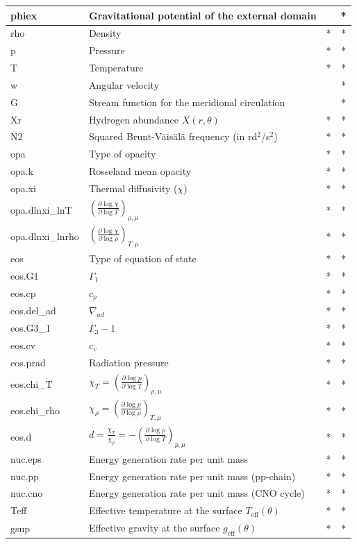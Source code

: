 \begin{longtable}{|l|p{8cm}|c|c|}
\hline
phiex&Gravitational potential of the external domain&&*\\
\hline
rho&Density&*&*\\
\hline
p&Pressure&*&*\\
\hline
T&Temperature&*&*\\
\hline
w&Angular velocity&&*\\
\hline
G&Stream function for the meridional circulation&&*\\
\hline
Xr&Hydrogen abundance $X(r,\theta)$&*&*\\
\hline
N2&Squared Brunt-V\"ais\"al\"a frequency (in rd$^2$/s$^2$)&*&*\\
\hline
opa&Type of opacity&*&*\\
\hline
opa.k&Rosseland mean opacity&*&*\\
\hline
opa.xi&Thermal diffusivity ($\chi$)&*&*\\
\hline
opa.dlnxi\_lnT&$\left(\frac{\partial\log\chi}{\partial\log T}\right)_{\rho,\mu}$&*&*\\
\hline
opa.dlnxi\_lnrho&$\left(\frac{\partial\log\chi}{\partial\log\rho}\right)_{T,\mu}$&*&*\\
\hline
eos&Type of equation of state&*&*\\
\hline
eos.G1&$\Gamma_1$&*&*\\
\hline
eos.cp&$c_p$&*&*\\
\hline
eos.del\_ad&$\nabla_{ad}$&*&*\\
\hline
eos.G3\_1&$\Gamma_3-1$&*&*\\
\hline
eos.cv&$c_v$&*&*\\
\hline
eos.prad&Radiation pressure&*&*\\
\hline
eos.chi\_T&$\chi_T=\left(\frac{\partial\log p}{\partial\log T}\right)_{\rho,\mu}$&*&*\\
\hline
eos.chi\_rho&$\chi_\rho=\left(\frac{\partial\log p}{\partial\log\rho}\right)_{T,\mu}$&*&*\\
\hline
eos.d&$d=\frac{\chi_T}{\chi_\rho}=-\left(\frac{\partial\log\rho}{\partial\log T}\right)_{p,\mu}$&*&*\\
\hline
nuc.eps&Energy generation rate per unit mass&*&*\\
\hline
nuc.pp&Energy generation rate per unit mass (pp-chain)&*&*\\
\hline
nuc.cno&Energy generation rate per unit mass (CNO cycle)&*&*\\
\hline
Teff&Effective temperature at the surface $T_\mathrm{eff}(\theta)$&*&*\\
\hline
gsup&Effective gravity at the surface $g_\mathrm{eff}(\theta)$&*&*\\

\end{longtable}
